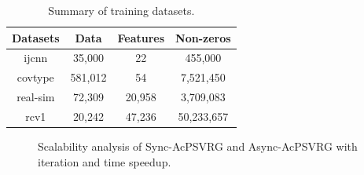 \begin{table}[htbp]
\begin{center}
\caption{Summary of training datasets.}
\begin{tabular}{ c|c|c|c } 
 \hline
 Datasets &  Data & Features & Non-zeros \\ 
 \hline
  ijcnn & 35,000 & 22 &  455,000\\
  covtype & 581,012 & 54 & 7,521,450\\ 
 real-sim &  72,309 & 20,958 &  3,709,083 \\
 rcv1 & 20,242 & 47,236 &  50,233,657\\
 \hline
\end{tabular}
\label{metadata}
\end{center}
\end{table}

\begin{figure}[htbp]
%
%
%
%
\setlength{\abovecaptionskip}{2pt}
\caption{Scalability analysis of Sync-AcPSVRG and Async-AcPSVRG with iteration and time speedup. }
\label{fig:FSVRG_speedup}
\end{figure}

